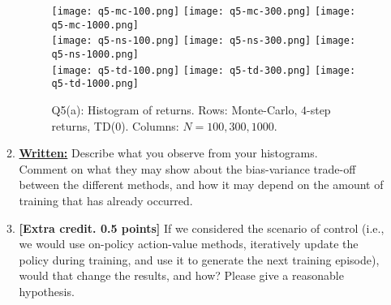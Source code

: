 \documentclass{article}
\begin{document}
\begin{enumerate}
\begin{enumerate}
{			            \begin{figure}
				            \begin{center}
					            \texttt{[image: q5-mc-100.png]}
					            \hfill
					            \texttt{[image: q5-mc-300.png]}
					            \hfill
					            \texttt{[image: q5-mc-1000.png]}
					            \\
					            \texttt{[image: q5-ns-100.png]}
					            \hfill
					            \texttt{[image: q5-ns-300.png]}
					            \hfill
					            \texttt{[image: q5-ns-1000.png]}
					            \\
					            \texttt{[image: q5-td-100.png]}
					            \hfill
					            \texttt{[image: q5-td-300.png]}
					            \hfill
					            \texttt{[image: q5-td-1000.png]}
				            \end{center}
				            \caption{Q5(a): Histogram of returns. Rows: Monte-Carlo, $4$-step returns, TD($0$). Columns: $N = 100, 300, 1000$.}
			            \end{figure}
		            }
		      \item \uline{\textbf{Written:}} Describe what you observe from your histograms. \\
		            Comment on what they may show about the bias-variance trade-off between the different methods, and how it may depend on the amount of training that has already occurred.

		      \item \textbf{[Extra credit. 0.5 points]} If we considered the scenario of control (i.e., we would use on-policy action-value methods, iteratively update the policy during training, and use it to generate the next training episode), would that change the results, and how? Please give a reasonable hypothesis.

	      \end{enumerate}

\end{enumerate}
\end{document}
